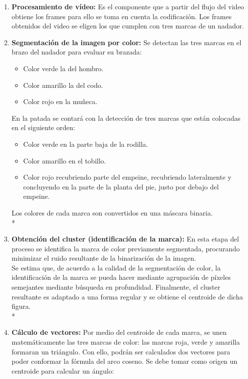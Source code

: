 \begin{enumerate}
    \item \textbf{Procesamiento de vídeo:}
    Es el componente que a partir del flujo del video obtiene los frames
    para ello se toma en cuenta la codificación.
    Los frames obtenidos del video se eligen los que cumplen 
    con tres marcas de un nadador.
    \item \textbf{Segmentación de la imagen por color:}
    Se detectan las tres marcas en el brazo del nadador 
    para evaluar su brazada:
    \begin{itemize}
        \item Color verde la del hombro.
        \item Color amarillo la del codo.
        \item Color rojo en la muñeca.
    \end{itemize}
    En la patada se contará con la detección de tres 
    marcas que están colocadas en el siguiente orden:
\begin{itemize}
   \item Color verde en la parte baja de la rodilla.
   \item Color amarillo en el tobillo.
   \item Color rojo recubriendo parte del empeine, recubriendo lateralmente 
   y concluyendo en la parte de la planta del pie, justo por debajo del empeine.
\end{itemize}
    Los colores de cada marca son convertidos en una máscara binaria.
\\*
    \item \textbf{Obtención del cluster (identificación de la marca):}
    En esta etapa del proceso se identifica la marca de color previamente 
    segmentada, procurando minimizar el ruido resultante de la binarización de 
    la imagen.\\
    Se estima que, de acuerdo a la calidad de la segmentación de color, la
    identificación de la marca se pueda hacer mediante agrupación de píxeles 
    semejantes mediante búsqueda en profundidad.
    Finalmente, el cluster resultante es adaptado a una forma regular y se obtiene el
    centroide de dicha figura.
\\*
    \item \textbf{Cálculo de vectores:}
    Por medio del centroide de cada marca, se unen matemáticamente las tres marcas de 
    color: las marcas roja, verde y amarilla formaran un triángulo. Con ello, podrán
    ser calculados dos vectores para poder conformar la fórmula del arco coseno.
    Se debe tomar como origen un centroide para calcular un ángulo:


\end{enumerate}
